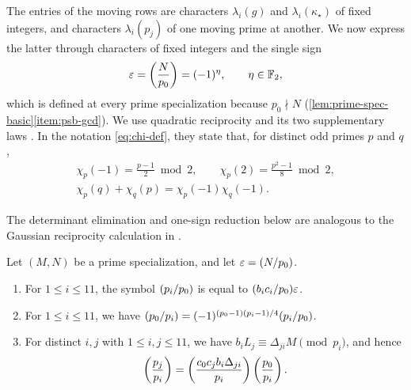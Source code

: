 The entries of the moving rows are characters $\lambda_i(g)$ and $\lambda_i(\kappa_\star)$ of fixed integers, and characters $\lambda_i(p_j)$ of one moving prime at another. We now express the latter through characters of fixed integers and the single sign
\begin{equation}\label{eq:eps-def}
\eps=\leg N{p_0}=(-1)^\eta,\qquad\eta\in\F_2,
\end{equation}
which is defined at every prime specialization because $p_0\nmid N$ (\cref{lem:prime-spec-basic}\ref{item:psb-gcd}). We use quadratic reciprocity and its two supplementary laws \cite[Chapter~5, Section~2, Theorem~1, p.~53]{IrelandRosen}. In the notation \eqref{eq:chi-def}, they state that, for distinct odd primes $p$ and $q$,
\begin{equation}\label{eq:reciprocity}
\begin{gathered}
\chi_p(-1)=\frac{p-1}2\bmod2,\qquad\chi_p(2)=\frac{p^2-1}8\bmod2,\\
\chi_p(q)+\chi_q(p)=\chi_p(-1)\chi_q(-1).
\end{gathered}
\end{equation}

The determinant elimination and one-sign reduction below are analogous to the Gaussian reciprocity calculation in \cite[Lemma~4.1]{Savoie2026}.

\begin{lemma}\label{lem:reciprocity}
Let $(M,N)$ be a prime specialization, and let $\eps=\leg N{p_0}$.
\begin{enumerate}[label=(\alph*),ref=(\alph*)]
\item\label{item:rec-pivot} For $1\le i\le11$, the symbol $\leg{p_i}{p_0}$ is equal to $\leg{b_ic_i}{p_0}\eps$.
\item\label{item:rec-reverse} For $1\le i\le11$, we have $\leg{p_0}{p_i}=(-1)^{(p_0-1)(p_i-1)/4}\leg{p_i}{p_0}$.
\item\label{item:rec-cross} For distinct $i,j$ with $1\le i,j\le11$, we have $b_iL_j\equiv\Delta_{ji}M\pmod{p_i}$, and hence
\begin{equation}\label{eq:rec-cross}
\leg{p_j}{p_i}=\leg{c_0c_jb_i\Delta_{ji}}{p_i}\leg{p_0}{p_i}.
\end{equation}
\end{enumerate}
\end{lemma}

